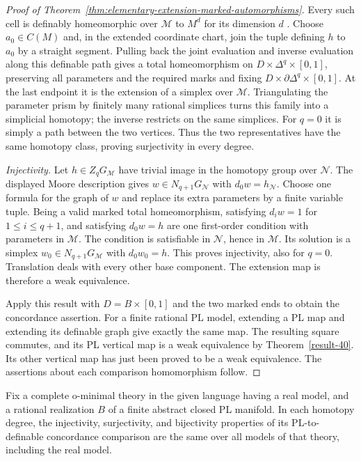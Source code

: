 \begin{proof}[Proof of Theorem~\ref{thm:elementary-extension-marked-automorphisms}]
Every such cell is definably homeomorphic over $\mathcal M$ to
$M^d$ for its dimension $d$
\cite[Proposition~2.5, pp.~18--19]{Coste1999}.
Choose $a_0\in C(M)$ and, in the extended coordinate chart, join
the tuple defining $h$ to $a_0$ by a straight segment.  Pulling back
the joint evaluation and inverse evaluation along this definable
path gives a total homeomorphism on
$D\times\Delta^q\times[0,1]$, preserving all parameters and the
required marks and fixing $D\times\partial\Delta^q\times[0,1]$.
At the last endpoint it is the extension of a simplex over
$\mathcal M$.  Triangulating the parameter prism by finitely many
rational simplices turns this family into a simplicial homotopy;
the inverse restricts on the same simplices.  For $q=0$ it is simply
a path between the two vertices.  Thus the two representatives have
the same homotopy class, proving surjectivity in every degree.

\medskip\noindent\textit{Injectivity.}
Let $h\in Z_qG_{\mathcal M}$ have trivial image in the homotopy
group over $\mathcal N$.  The displayed Moore description gives
$w\in N_{q+1}G_{\mathcal N}$ with $d_0w=h_{\mathcal N}$.
Choose one formula for the graph of $w$ and replace its extra
parameters by a finite variable tuple.  Being a valid marked total
homeomorphism, satisfying $d_iw=1$ for $1\leq i\leq q+1$, and
satisfying $d_0w=h$ are one first-order condition with parameters
in $\mathcal M$.  The condition is satisfiable in $\mathcal N$,
hence in $\mathcal M$.  Its solution is a simplex
$w_0\in N_{q+1}G_{\mathcal M}$ with $d_0w_0=h$.  This proves
injectivity, also for $q=0$.  Translation deals with every other
base component.  The extension map is therefore a weak equivalence.

Apply this result with $D=B\times[0,1]$ and the two marked ends to
obtain the concordance assertion.  For a finite rational PL model,
extending a PL map and extending its definable graph give exactly
the same map.  The resulting square commutes, and its PL vertical
map is a weak equivalence by Theorem~\ref{result-40}.  Its other
vertical map has just been proved to be a weak equivalence.
The assertions about each comparison homomorphism follow.
\end{proof}

\begin{corollary}\label{cor:complete-theory-concordance-comparison}
Fix a complete o-minimal theory in the given language having a real
model, and a rational realization $B$ of a finite abstract closed PL
manifold.  In each homotopy degree, the
injectivity, surjectivity, and bijectivity properties of its
PL-to-definable concordance comparison are the same over all models
of that theory, including the real model.
\end{corollary}

